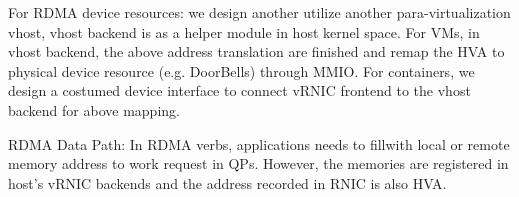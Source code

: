 For RDMA device resources: we design another utilize another para-virtualization vhost, vhost backend is as a helper module in host kernel space. For VMs, in vhost backend, the above address translation are finished  and remap the HVA to physical device resource (e.g. DoorBells) through MMIO. For containers, we design a costumed device interface to connect vRNIC frontend to the vhost backend for above mapping.
 
RDMA Data Path: In RDMA verbs, applications needs to fillwith local or remote memory address to work request in QPs. However, the memories are registered in host's vRNIC backends and the address recorded in RNIC is also HVA. 
 

 